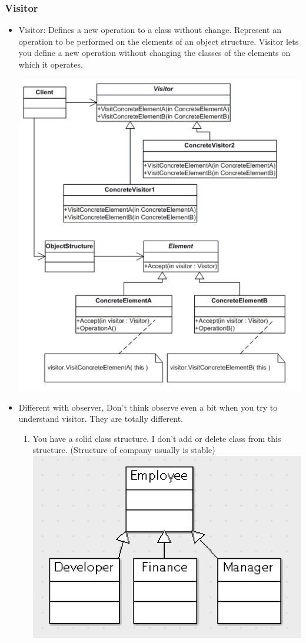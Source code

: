 \documentclass[a4paper,12pt,twoside]{book}
\begin{document}
\subsubsection{Visitor}
\begin{itemize}
\item Visitor: Defines a new operation to a class without change. Represent an operation to be performed on the elements of an object structure. Visitor lets you define a new operation without changing the classes of the elements on which it operates.

\includegraphics[scale=0.75]{pics/visitor.png}

\item Different with observer, Don't think observe even a bit when you try to understand visitor. They are totally different. 

\begin{enumerate}
\item You have a solid class structure.  I don't add or delete class from this structure. (Structure of company usually is stable)
\includegraphics[scale=0.75]{pics/v1.png}


\end{enumerate}
\end{itemize}
\end{document}
